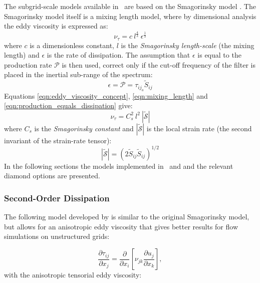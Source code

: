 The subgrid-scale models available in \fluidity\ are based on the Smagorinsky model
\citep{smagorinsky1963general}. The Smagorinsky model itself is a mixing length model, where by
dimensional analysis \citep{deardorff1970, germano1992} the eddy viscosity is expressed as:
\begin{equation}
\nu_\tau = c \ l^{\frac{4}{3}} \ \epsilon^{\frac 1 3}
\label{eqn:mixing_length}
\end{equation}
where $c$ is a dimensionless constant, $l$ is the \emph{Smagorinsky length-scale} (the mixing length)
and $\epsilon$ is the rate of dissipation. The assumption that $\epsilon$ is equal to the production
rate $\mathcal{P}$ is then used, correct only if the cut-off frequency of the filter is placed in the
inertial sub-range of the spectrum:
\begin{equation}
\epsilon = \mathcal{P} = \tau_{{ij}_a} \tilde S_{ij}
\label{eqn:production_equals_dissipation}
\end{equation}
Equations \eqref{eqn:eddy_viscosity_concept}, \eqref{eqn:mixing_length} and
\eqref{eqn:production_equals_dissipation} give: 
\begin{equation}
\nu_\tau = C_s^2 \ l^2 \ \left| \mathcal{\tilde S} \right| 
\end{equation}
where $C_s$ is the \emph{Smagorinsky constant} and $\left | \mathcal{\tilde S} \right |$ is the local strain
rate (the second invariant of the strain-rate tensor):
\begin{equation}
\left| \mathcal{\tilde S} \right| = \left( 2 \tilde S_{ij} \tilde S_{ij} \right)^{1/2}
\end{equation}
In the following sections the models implemented in \fluidity\ and and the relevant
diamond options are presented.

\subsubsection{Second-Order Dissipation}
\label{sec:second_order_diss_LES}

The following model developed by \citet{bentham2003} is similar to the original Smagorinsky model, but allows for an anisotropic eddy viscosity that gives better results for flow simulations on unstructured grids:

\begin{equation}\label{smag}
\frac{\partial \tau_{ij}}{\partial x_j} = \frac{\partial}{\partial x_i} \left [ \nu_{jk}\frac{\partial u_j}{\partial x_k} \right ],
\end{equation}
with the anisotropic tensorial eddy viscosity:


